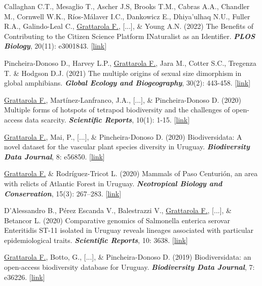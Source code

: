 \documentclass[9pt]{developercv} %
\begin{document}
\begin{etaremune}
\item Callaghan C.T., Mesaglio T., Ascher J.S, Brooks T.M., Cabras A.A., Chandler M., Cornwell W.K., Ríos-Málaver I.C., Dankowicz E., Dhiya’ulhaq N.U., Fuller R.A., Galindo-Leal C., \underline{Grattarola F.}, [...], \& Young A.N. (2022) The Benefits of Contributing to the Citizen Science Platform INaturalist as an Identifier. \textit{\textbf{PLOS Biology}}, 20(11): e3001843. [\href{https://doi.org/10.1371/journal.pbio.3001843}{link}]

\item Pincheira-Donoso D., Harvey L.P., \underline{Grattarola F.}, Jara M., Cotter S.C., Tregenza T. \& Hodgson D.J. (2021) The multiple origins of sexual size dimorphism in global amphibians. \textit{\textbf{Global Ecology and Biogeography}}, 30(2): 443-458. [\href{https://doi.org/10.1111/geb.13230}{link}]

\item \underline{Grattarola F.}, Martínez-Lanfranco, J.A., [...], \& Pincheira-Donoso D. (2020) Multiple forms of hotspots of tetrapod biodiversity and the challenges of open-access data scarcity. \textit{\textbf{Scientific Reports}}, 10(1): 1-15. [\href{https://doi.org/10.1038/s41598-020-79074-8}{link}]

\item \underline{Grattarola F.}, Mai, P., [...], \& Pincheira-Donoso D. (2020) Biodiversidata: A novel dataset for the vascular plant species diversity in Uruguay. \textit{\textbf{Biodiversity Data Journal}}, 8: e56850. [\href{https://doi.org/10.3897/BDJ.8.e56850}{link}]

\item \underline{Grattarola F.} \& Rodríguez-Tricot L. (2020) Mammals of Paso Centurión, an area with relicts of Atlantic Forest in Uruguay. \textit{\textbf{Neotropical Biology and Conservation}}, 15(3): 267–283. [\href{https://doi.org/10.3897/neotropical.15.e53062}{link}]

\item D’Alessandro B., Pérez Escanda V., Balestrazzi V., \underline{Grattarola F.}, [...], \& Betancor L.  (2020) Comparative genomics of Salmonella enterica serovar Enteritidis ST-11 isolated in Uruguay reveals lineages associated with particular epidemiological traits. \textit{\textbf{Scientific Reports}}, 10: 3638. [\href{https://doi.org/10.1038/s41598-020-60502-8}{link}]

\item \underline{Grattarola F.}, Botto, G., [...], \& Pincheira-Donoso D. (2019) Biodiversidata: an open-access biodiversity database for Uruguay. \textit{\textbf{Biodiversity Data Journal}}, 7: e36226. [\href{https://doi.org/10.3897/BDJ.7.e36226}{link}]


\end{etaremune}
\end{document}
